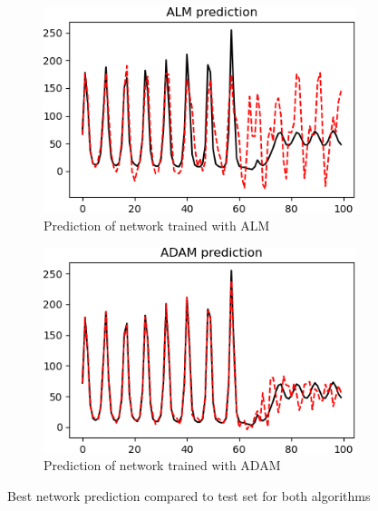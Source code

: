 \begin{figure}[p]
     \centering
     \begin{subfigure}[b]{0.49\textwidth}
         \centering
         \includegraphics[width=\textwidth]{almpred}
         \caption{Prediction of network trained with ALM}
         \label{almpred}
     \end{subfigure}
     \begin{subfigure}[b]{0.49\textwidth}
         \centering
         \includegraphics[width=\textwidth]{adampred}
         \caption{Prediction of network trained with ADAM}
         \label{adampred}
     \end{subfigure}
     \caption{Best network prediction compared to test set for both algorithms}
     \label{laserpred}
\end{figure}

